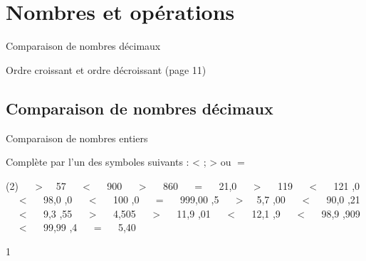 \documentclass[a4paper,11pt]{report}
\begin{document}
\newcommand{\chapterName}{Nombres et opérations}
\newcommand{\serieName}{Comparaison de nombres décimaux}


\chapter*{\chapterName}
\thispagestyle{empty}

\begin{amL}{\serieName}{
\item Ordre croissant et ordre décroissant (page 11)
}
\end{amL}
\section*{\serieName}
\setcounter{page}{1}
\thispagestyle{firstPage}




\vfill

\begin{resolu}{Comparaison de nombres entiers}{Complète par l'un des symboles suivants : < ; > ou $=$
\begin{tasks}[after-item-skip = 0.5em, after-skip=-0.5em](2)
 $\quad${\color{blue} >}$\quad$ 57
 $\quad${\color{blue} <} $\quad$ 900
 $\quad${\color{blue} >} $\quad$ 860
 $\quad${\color{blue} =} $\quad$ 21,0
 $\quad${\color{blue} >} $\quad$ 119
 $\quad${\color{blue} <} $\quad$ 121
,0 $\quad${\color{blue} <} $\quad$ 98,0
,0 $\quad${\color{blue} <} $\quad$ 100
,0 $\quad${\color{blue} =} $\quad$ 999,00
,5 $\quad${\color{blue} >}$\quad$ 5,7
,00 $\quad${\color{blue} <} $\quad$ 90,0
,21 $\quad${\color{blue} <} $\quad$ 9,3
,55 $\quad${\color{blue} >} $\quad$ 4,505
 $\quad${\color{blue} >} $\quad$ 11,9
,01 $\quad${\color{blue} <} $\quad$ 12,1
,9 $\quad${\color{blue} <} $\quad$ 98,9
,909 $\quad${\color{blue} <} $\quad$ 99,99
,4 $\quad${\color{blue} =} $\quad$ 5,40
\end{tasks}
}{1}
\end{resolu}
\end{document}
